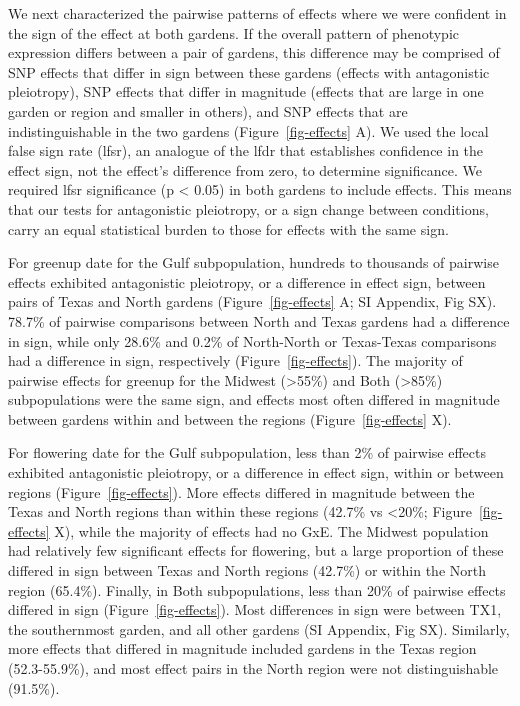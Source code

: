 \documentclass[
  9pt,
  twocolumn,
  twoside]{pnas-new}
\begin{document}
We next characterized the pairwise patterns of effects where we were
confident in the sign of the effect at both gardens. If the overall
pattern of phenotypic expression differs between a pair of gardens, this
difference may be comprised of SNP effects that differ in sign between
these gardens (effects with antagonistic pleiotropy), SNP effects that
differ in magnitude (effects that are large in one garden or region and
smaller in others), and SNP effects that are indistinguishable in the
two gardens (Figure~\ref{fig-effects} A). We used the local false sign
rate (lfsr), an analogue of the lfdr that establishes confidence in the
effect sign, not the effect's difference from zero, to determine
significance. We required lfsr significance (p \textless{} 0.05) in both
gardens to include effects. This means that our tests for antagonistic
pleiotropy, or a sign change between conditions, carry an equal
statistical burden to those for effects with the same sign.

For greenup date for the Gulf subpopulation, hundreds to thousands of
pairwise effects exhibited antagonistic pleiotropy, or a difference in
effect sign, between pairs of Texas and North gardens
(Figure~\ref{fig-effects} A; SI Appendix, Fig SX). 78.7\% of pairwise
comparisons between North and Texas gardens had a difference in sign,
while only 28.6\% and 0.2\% of North-North or Texas-Texas comparisons
had a difference in sign, respectively (Figure~\ref{fig-effects}). The
majority of pairwise effects for greenup for the Midwest
(\textgreater55\%) and Both (\textgreater85\%) subpopulations were the
same sign, and effects most often differed in magnitude between gardens
within and between the regions (Figure~\ref{fig-effects} X).

For flowering date for the Gulf subpopulation, less than 2\% of pairwise
effects exhibited antagonistic pleiotropy, or a difference in effect
sign, within or between regions (Figure~\ref{fig-effects}). More effects
differed in magnitude between the Texas and North regions than within
these regions (42.7\% vs \textless20\%; Figure~\ref{fig-effects} X),
while the majority of effects had no GxE. The Midwest population had
relatively few significant effects for flowering, but a large proportion
of these differed in sign between Texas and North regions (42.7\%) or
within the North region (65.4\%). Finally, in Both subpopulations, less
than 20\% of pairwise effects differed in sign
(Figure~\ref{fig-effects}). Most differences in sign were between TX1,
the southernmost garden, and all other gardens (SI Appendix, Fig SX).
Similarly, more effects that differed in magnitude included gardens in
the Texas region (52.3-55.9\%), and most effect pairs in the North
region were not distinguishable (91.5\%).
\end{document}
